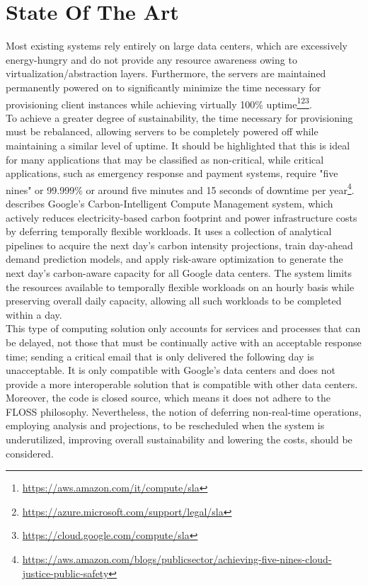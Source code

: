\section{State Of The Art}
\label{sec:introduction_state_of_the_art}

Most existing systems rely entirely on large data centers, which are excessively
energy-hungry and do not provide any resource awareness owing to virtualization/abstraction
layers. Furthermore, the servers are maintained permanently powered on to
significantly minimize the time necessary for provisioning client instances
while achieving virtually 100\% uptime\footnote{\url{https://aws.amazon.com/it/compute/sla}}\footnote{\url{https://azure.microsoft.com/support/legal/sla}}\footnote{\url{https://cloud.google.com/compute/sla}}.
\\ %
To achieve a greater degree of sustainability, the time necessary for
provisioning must be rebalanced, allowing servers to be completely powered off while
maintaining a similar level of uptime. It should be highlighted that this is
ideal for many applications that may be classified as non-critical, while critical
applications, such as emergency response and payment systems, require "five
nines" or 99.999\% or around five minutes and 15 seconds of downtime per year\footnote{\url{https://aws.amazon.com/blogs/publicsector/achieving-five-nines-cloud-justice-public-safety}}.
\\ %

\cite{carbon_aware_computing_datacenters} describes Google's Carbon-Intelligent Compute
Management system, which actively reduces electricity-based carbon footprint and
power infrastructure costs by deferring temporally flexible workloads. It uses a
collection of analytical pipelines to acquire the next day's carbon intensity projections,
train day-ahead demand prediction models, and apply risk-aware optimization to generate
the next day's carbon-aware capacity for all Google data centers. The system
limits the resources available to temporally flexible workloads on an hourly
basis while preserving overall daily capacity, allowing all such workloads to be
completed within a day. \\ %
This type of computing solution only accounts for services and processes that can
be delayed, not those that must be continually active with an acceptable
response time; sending a critical email that is only delivered the following day
is unacceptable. It is only compatible with Google's data centers and does not
provide a more interoperable solution that is compatible with other data centers.
Moreover, the code is closed source, which means it does not adhere to the FLOSS
philosophy. Nevertheless, the notion of deferring non-real-time operations,
employing analysis and projections, to be rescheduled when the system is underutilized,
improving overall sustainability and lowering the costs, should be considered.
\\ %

